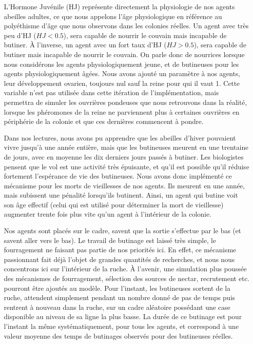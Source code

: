 		L'Hormone Juvénile (HJ) représente directement la physiologie de nos agents abeilles adultes, ce que nous appelons l'âge physiologique en référence au polyéthisme d'âge que nous observons dans les colonies réelles. Un agent avec très peu d'HJ ($HJ < 0.5$), sera capable de nourrir le couvain mais incapable de butiner. À l'inverse, un agent avec un fort taux d'HJ ($HJ > 0.5$), sera capable de butiner mais incapable de nourrir le couvain. On parle donc de nourrices lorsque nous considérons les agents physiologiquement jeune, et de butineuses pour les agents physiologiquement âgées. Nous avons ajouté un paramètre à nos agents, leur développement ovarien, toujours nul sauf la reine pour qui il vaut 1. Cette variable n'est pas utilisée dans cette itération de l'implémentation, mais permettra de simuler les ouvrières pondeuses que nous retrouvons dans la réalité, lorsque les phéromones de la reine ne parviennent plus à certaines ouvrières en périphérie de la colonie et que ces dernières commencent à pondre.
		
		Dans nos lectures, nous avons pu apprendre que les abeilles d'hiver pouvaient vivre jusqu'à une année entière, mais que les butineuses meurent en une trentaine de jours, avec en moyenne les dix derniers jours passés à butiner. Les biologistes pensent que le vol est une activité très épuisante, et qu'il est possible qu'il réduise fortement l'espérance de vie des butineuses. Nous avons donc implémenté ce mécanisme pour les morts de vieillesses de nos agents. Ils meurent en une année, mais subissent une pénalité lorsqu'ils butinent. Ainsi, un agent qui butine voit son âge effectif (celui qui est utilisé pour déterminer la mort de vieillesse) augmenter trente fois plus vite qu'un agent à l'intérieur de la colonie.
		
		Nos agents sont placés sur le cadre, savent que la sortie s'effectue par le bas (et savent aller vers le bas). Le travail de butinage est laissé très simple, le fourragement ne faisant pas partie de nos priorités ici. En effet, ce mécanisme passionnant fait déjà l'objet de grandes quantités de recherches, et nous nous concentrons ici sur l'intérieur de la ruche. À l'avenir, une simulation plus poussée des mécanismes de fourragement, sélection des sources de nectar, recrutement etc. pourront être ajoutés au modèle. Pour l'instant, les butineuses sortent de la ruche, attendent simplement pendant un nombre donné de pas de temps puis rentrent à nouveau dans la ruche, sur un cadre aléatoire possédant une case disponible au niveau de sa ligne la plus basse. La durée de ce butinage est pour l'instant la même systématiquement, pour tous les agents, et correspond à une valeur moyenne des temps de butinages observés pour des butineuses réelles.
		
